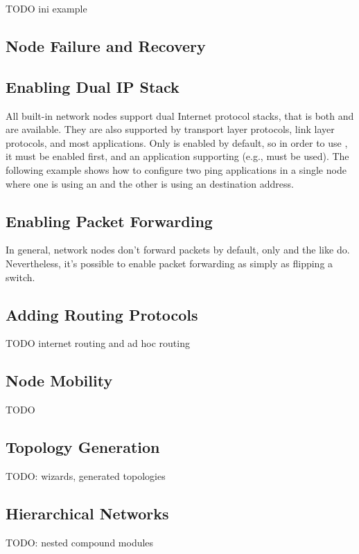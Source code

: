 TODO ini example


\subsection{Node Failure and Recovery}

\subsection{Enabling Dual IP Stack}

All built-in network nodes support dual Internet protocol stacks, that is
both  and  are available. They are also
supported by transport layer protocols, link layer protocols, and most
applications. Only  is enabled by default, so in order to
use , it must be enabled first, and an application
supporting  (e.g.,  must be used). The
following example shows how to configure two ping applications in a single
node where one is using an  and the other is using an
 destination address.


\subsection{Enabling Packet Forwarding}

In general, network nodes don't forward packets by default, only
 and the like do. Nevertheless, it's possible to enable
packet forwarding as simply as flipping a switch.


\subsection{Adding Routing Protocols}

TODO internet routing and ad hoc routing

\subsection{Node Mobility}

TODO

\subsection{Topology Generation}

TODO: wizards, generated topologies

\subsection{Hierarchical Networks}

TODO: nested compound modules



